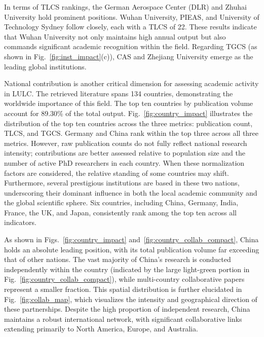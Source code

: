 \documentclass[]{interact}
\theoremstyle{plain}%
\theoremstyle{definition}
\theoremstyle{remark}
\begin{document}
In terms of TLCS rankings, the German Aerospace Center (DLR) and Zhuhai University hold prominent positions. Wuhan University, PIEAS, and University of Technology Sydney follow closely, each with a TLCS of 22. These results indicate that Wuhan University not only maintains high annual output but also commands significant academic recognition within the field. Regarding TGCS (as shown in Fig.~\ref{fig:inst_impact}(c)), CAS and Zhejiang University emerge as the leading global institutions. 


National contribution is another critical dimension for assessing academic activity in LULC. The retrieved literature spans 134 countries, demonstrating the worldwide importance of this field. The top ten countries by publication volume account for 89.30\% of the total output. Fig.~\ref{fig:country_impact} illustrates the distribution of the top ten countries across the three metrics: publication count, TLCS, and TGCS. Germany and China rank within the top three across all three metrics. However, raw publication counts do not fully reflect national research intensity; contributions are better assessed relative to population size and the number of active PhD researchers in each country. When these normalization factors are considered, the relative standing of some countries may shift. Furthermore, several prestigious institutions are based in these two nations, underscoring their dominant influence in both the local academic community and the global scientific sphere. Six countries, including China, Germany, India, France, the UK, and Japan, consistently rank among the top ten across all indicators. 



As shown in Figs.~\ref{fig:country_impact} and~\ref{fig:country_collab_compact}, China holds an absolute leading position, with its total publication volume far exceeding that of other nations. The vast majority of China's research is conducted independently within the country (indicated by the large light-green portion in Fig.~\ref{fig:country_collab_compact}), while multi-country collaborative papers represent a smaller fraction. This spatial distribution is further elucidated in Fig.~\ref{fig:collab_map}, which visualizes the intensity and geographical direction of these partnerships. Despite the high proportion of independent research, China maintains a robust international network, with significant collaborative links extending primarily to North America, Europe, and Australia.
\end{document}
